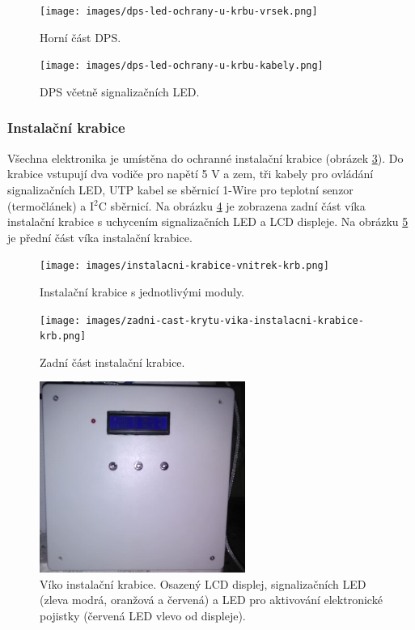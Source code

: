 \begin{figure}[H]
    \centering
    \texttt{[image: images/dps-led-ochrany-u-krbu-vrsek.png]}
    \caption{Horní část DPS.}
    \label{fig:dps-led-ochrany-u-krbu-vrsek}
\end{figure}

\begin{figure}[H]
    \centering
    \texttt{[image: images/dps-led-ochrany-u-krbu-kabely.png]}
    \caption{DPS včetně signalizačních LED.}
    \label{fig:dps-led-ochrany-u-krbu-kabely}
\end{figure}

\subsubsection{Instalační krabice}
Všechna elektronika je umístěna do ochranné instalační krabice (obrázek \ref{fig:instalacni-krabice-vnitrek-krb}). Do krabice vstupují dva vodiče pro napětí 5 V a zem, tři kabely pro ovládání signalizačních LED, UTP kabel se sběrnicí 1-Wire pro teplotní senzor (termočlánek) a I$^2$C sběrnicí. Na obrázku \ref{fig:zadni-cast-krytu-vika-instalacni-krabice-krb} je zobrazena zadní část víka instalační krabice s uchycením signalizačních LED a LCD displeje. Na obrázku \ref{fig:predni-cast-krytu-vika-instalacni-krabice-krb} je přední část víka instalační krabice.

\begin{figure}[H]
    \centering
    \texttt{[image: images/instalacni-krabice-vnitrek-krb.png]}
    \caption{Instalační krabice s jednotlivými moduly.}
    \label{fig:instalacni-krabice-vnitrek-krb}
\end{figure}

\begin{figure}[H]
    \centering
    \texttt{[image: images/zadni-cast-krytu-vika-instalacni-krabice-krb.png]}
    \caption{Zadní část instalační krabice.}
    \label{fig:zadni-cast-krytu-vika-instalacni-krabice-krb}
\end{figure}

\begin{figure}[H]
    \centering
    \includegraphics[width=0.6\textwidth]{images/predni-cast-krytu-vika-instalacni-krabice-krb.png}
    \caption[Víko instalační krabice.]{Víko instalační krabice. Osazený LCD displej, signalizačních LED (zleva modrá, oranžová a červená) a LED pro aktivování elektronické pojistky (červená LED vlevo od displeje).}
    \label{fig:predni-cast-krytu-vika-instalacni-krabice-krb}
\end{figure}